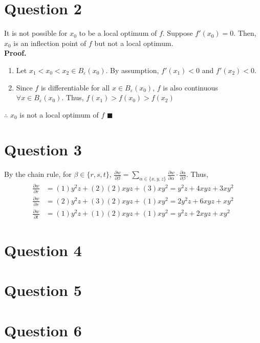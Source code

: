 \documentclass{article}
\begin{document}
\section*{Question 2}
It is not possible for $x_0$ to be a local optimum of $f$. Suppose $f'(x_0)=0$. Then, $x_0$ is an inflection point of $f$ but not a local optimum.
\medskip \\
\textbf{Proof.}
\begin{enumerate}
	\item Let $x_1<x_0<x_2\in B_\varepsilon(x_0)$.  By assumption, $f'(x_1)<0$ and $f'(x_2)<0$.
	\item Since $f$ is differentiable for all $x\in  B_\varepsilon(x_0)$, $f$ is also continuous  $\forall x\in  B_\varepsilon(x_0)$. Thus, $f(x_1)>f(x_0)>f(x_2)$
\end{enumerate}
$\therefore$ $x_0$ is not a local optimum of $f$ $\blacksquare$



\section*{Question 3}
By the chain rule, for $\beta\in\{r,s,t\}$, $\frac{\partial w}{\partial\beta}=\sum_{\alpha\in\{x,y,z\}}\frac{\partial w}{\partial\alpha}\cdot\frac{\partial\alpha}{\partial\beta}$. Thus,
\begin{align*}
	\frac{\partial w}{\partial r} &= (1)y^2z + (2)(2)xyz + (3)xy^2 = y^2z  + 4xyz + 3xy^2	\\
	\frac{\partial w}{\partial s} &= (2)y^2z + (3)(2)xyz + (1)xy^2 = 2y^2z + 6xyz + xy^2 	\\
	\frac{\partial w}{\partial t} &= (1)y^2z + (1)(2)xyz + (1)xy^2 = y^2z  + 2xyz + xy^2
\end{align*}



\section*{Question 4}



\section*{Question 5}




\section*{Question 6}


\end{document}
